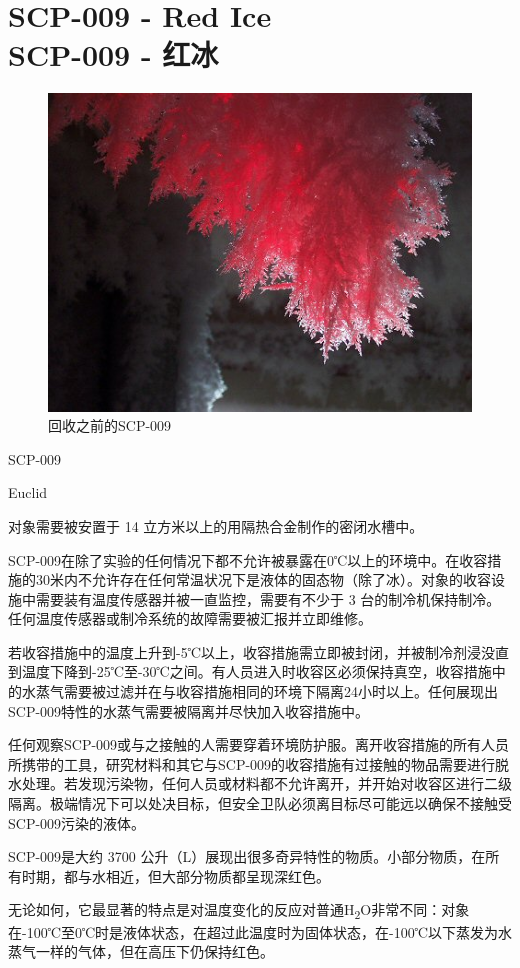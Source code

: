 \chapter[SCP-009 红冰]{
	SCP-009 - Red Ice\\
	SCP-009 - 红冰
}

\label{chap:SCP-009}

\begin{figure}[H]
	\centering
	\includegraphics[width=0.5\linewidth]{images/SCP.009.jpg}
	\caption*{回收之前的SCP-009}
\end{figure}

SCP-009

Euclid

对象需要被安置于 14 立方米以上的用隔热合金制作的密闭水槽中。

SCP-009在除了实验的任何情况下都不允许被暴露在0℃以上的环境中。在收容措施的30米内不允许存在任何常温状况下是液体的固态物（除了冰）。对象的收容设施中需要装有温度传感器并被一直监控，需要有不少于 3 台的制冷机保持制冷。任何温度传感器或制冷系统的故障需要被汇报并立即维修。

若收容措施中的温度上升到-5℃以上，收容措施需立即被封闭，并被制冷剂浸没直到温度下降到-25℃至-30℃之间。有人员进入时收容区必须保持真空，收容措施中的水蒸气需要被过滤并在与收容措施相同的环境下隔离24小时以上。任何展现出SCP-009特性的水蒸气需要被隔离并尽快加入收容措施中。

任何观察SCP-009或与之接触的人需要穿着环境防护服。离开收容措施的所有人员所携带的工具，研究材料和其它与SCP-009的收容措施有过接触的物品需要进行脱水处理。若发现污染物，任何人员或材料都不允许离开，并开始对收容区进行二级隔离。极端情况下可以处决目标，但安全卫队必须离目标尽可能远以确保不接触受SCP-009污染的液体。

SCP-009是大约 3700 公升（L）展现出很多奇异特性的物质。小部分物质，在所有时期，都与水相近，但大部分物质都呈现深红色。

无论如何，它最显著的特点是对温度变化的反应对普通H\textsubscript{2}O非常不同：对象在-100℃至0℃时是液体状态，在超过此温度时为固体状态，在-100℃以下蒸发为水蒸气一样的气体，但在高压下仍保持红色。

